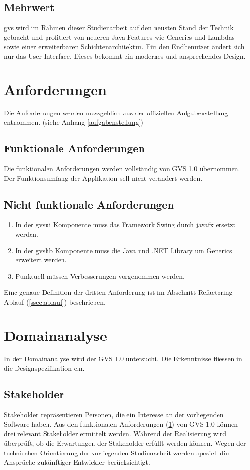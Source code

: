 \documentclass[11pt,a4paper,english,oneside]{book}
\numberwithin{equation}{chapter}
\begin{document}
	\subsection{Mehrwert}
	\gls{gvs} wird im Rahmen dieser Studienarbeit auf den neusten Stand der Technik gebracht und profitiert von neueren Java Features wie Generics und Lambdas sowie einer erweiterbaren Schichtenarchitektur. 
	Für den Endbenutzer ändert sich nur das User Interface. Dieses bekommt ein modernes und ansprechendes Design.

	
	\section{Anforderungen} \label{sec:functionalreq}
	Die Anforderungen werden massgeblich aus der offiziellen Aufgabenstellung entnommen. (siehe Anhang \ref{aufgabenstellung})
	
	\subsection{Funktionale Anforderungen}
	Die funktionalen Anforderungen werden vollständig von GVS 1.0 \cite{gvs1} übernommen. Der Funktionsumfang der Applikation soll nicht verändert werden.
	
	\subsection{Nicht funktionale Anforderungen}
	
	\begin{enumerate}
		\item In der \gls{gvsui} Komponente muss das Framework Swing durch \gls{javafx} ersetzt werden.
		\item In der \gls{gvslib} Komponente muss die Java und .NET Library um Generics erweitert werden. 
		\item Punktuell müssen Verbesserungen vorgenommen werden.
	\end{enumerate}

	Eine genaue Definition der dritten Anforderung ist im Abschnitt Refactoring Ablauf (\ref{ssec:ablauf}) beschrieben.
	
	\section{Domainanalyse}
	In der Domainanalyse wird der GVS 1.0 untersucht. Die Erkenntnisse fliessen in die Designspezifikation ein.
		
	\subsection{Stakeholder}
	Stakeholder repräsentieren Personen, die ein Interesse an der vorliegenden Software haben. Aus den funktionalen Anforderungen (\ref{sec:functionalreq}) von GVS 1.0 können drei relevant Stakeholder ermittelt werden. Während der Realisierung wird überprüft, ob die Erwartungen der Stakeholder erfüllt werden können. Wegen der technischen Orientierung der vorliegenden Studienarbeit werden speziell die Ansprüche zukünftiger Entwickler berücksichtigt.
	
\end{document}
